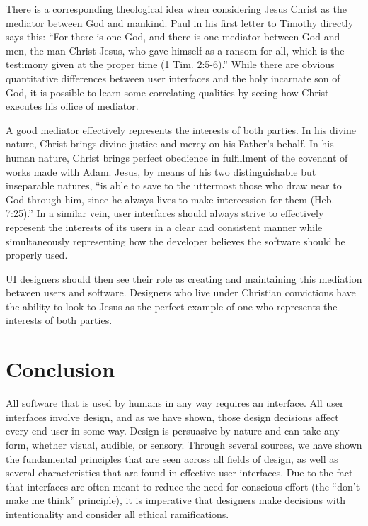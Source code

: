 \documentclass[12pt, oneside]{article}
\begin{document}
There is a corresponding theological idea when considering Jesus Christ as the mediator between God and mankind. Paul in his first letter to Timothy directly says this: ``For there is one God, and there is one mediator between God and men, the man Christ Jesus, who gave himself as a ransom for all, which is the testimony given at the proper time (1 Tim. 2:5-6).'' While there are obvious quantitative differences between user interfaces and the holy incarnate son of God, it is possible to learn some correlating qualities by seeing how Christ executes his office of mediator.

A good mediator effectively represents the interests of both parties. In his divine nature, Christ brings divine justice and mercy on his Father's behalf. In his human nature, Christ brings perfect obedience in fulfillment of the covenant of works made with Adam. Jesus, by means of his two distinguishable but inseparable natures, ``is able to save to the uttermost those who draw near to God through him, since he always lives to make intercession for them (Heb. 7:25).'' In a similar vein, user interfaces should always strive to effectively represent the interests of its users in a clear and consistent manner while simultaneously representing how the developer believes the software should be properly used.

UI designers should then see their role as creating and maintaining this mediation between users and software. Designers who live under Christian convictions have the ability to look to Jesus as the perfect example of one who represents the interests of both parties.

\section{Conclusion}

All software that is used by humans in any way requires an interface. All user interfaces involve design, and as we have shown, those design decisions affect every end user in some way. Design is persuasive by nature and can take any form, whether visual, audible, or sensory. Through several sources, we have shown the fundamental principles that are seen across all fields of design, as well as several characteristics that are found in effective user interfaces. Due to the fact that interfaces are often meant to reduce the need for conscious effort (the ``don't make me think'' principle), it is imperative that designers make decisions with intentionality and consider all ethical ramifications.
\end{document}
